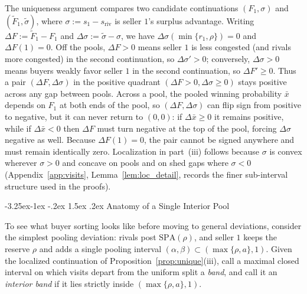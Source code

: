 \documentclass[12pt]{article}
\makeatletter
\theoremstyle{mystyle}
\theoremstyle{mystyle2}
\newcommand{\mmpfont}{\scshape}
\renewcommand\subsection{\@startsection{subsection}{2}{\z@}%
                                     {-3.25ex\@plus -1ex \@minus -.2ex}%
                                     {1.5ex \@plus .2ex}%
                                     {\normalfont\normalsize\mmpfont}}
\newcommand{\SPA}{\mathrm{SPA}}
\newcommand{\1}{\mathbf{1}}
\makeatother
\begin{document}
The uniqueness argument compares two candidate continuations $(F_1,\sigma)$ and $(\tilde F_1,\tilde\sigma)$, where $\sigma:=s_1-s_{\mathrm{riv}}$ is seller $1$'s surplus advantage. Writing $\Delta F:=\tilde F_1-F_1$ and $\Delta\sigma:=\tilde\sigma-\sigma$, we have $\Delta\sigma(\min\{r_1,\rho\})=0$ and $\Delta F(1)=0$. Off the pools, $\Delta F>0$ means seller $1$ is less congested (and rivals more congested) in the second continuation, so $\Delta\sigma'>0$; conversely, $\Delta\sigma>0$ means buyers weakly favor seller $1$ in the second continuation, so $\Delta F'\ge 0$. Thus a pair $(\Delta F,\Delta\sigma)$ in the positive quadrant $(\Delta F>0,\Delta\sigma\ge 0)$ stays positive across any gap between pools. Across a pool, the pooled winning probability $\bar x$ depends on $F_1$ at both ends of the pool, so $(\Delta F,\Delta\sigma)$ can flip sign from positive to negative, but it can never return to $(0,0)$: if $\Delta\bar x\ge 0$ it remains positive, while if $\Delta\bar x<0$ then $\Delta F$ must turn negative at the top of the pool, forcing $\Delta\sigma$ negative as well. Because $\Delta F(1)=0$, the pair cannot be signed anywhere and must remain identically zero. Localization in part~(iii) follows because $\sigma$ is convex wherever $\sigma>0$ and concave on pools and on shed gaps where $\sigma<0$ (Appendix~\ref{app:visits}, Lemma~\ref{lem:loc_detail}, records the finer sub-interval structure used in the proofs).

\subsection{Anatomy of a Single Interior Pool}

To see what buyer sorting looks like before moving to general deviations, consider the simplest pooling deviation: rivals post $\SPA(\rho)$, and seller $1$ keeps the reserve $\rho$ and adds a single pooling interval $(\alpha,\beta)\subset(\max\{\rho,a\},1)$. Given the localized continuation of Proposition~\ref{prop:unique}(iii), call a maximal closed interval on which visits depart from the uniform split a \emph{band}, and call it an \emph{interior band} if it lies strictly inside $(\max\{\rho,a\},1)$.
\end{document}
